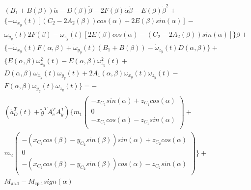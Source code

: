 \begin{equation}%
\label{eq:p3:46}
\begin{multlined}
	( 
		B_{1}+
		B (  \beta  )  
	) \ddot \alpha -
	D (  \beta  ) \ddot \beta -
	2F (  \beta  ) \dot \alpha \dot \beta -
	E (  \beta  )  \dot{\beta}^{2}+ \\
	 \lbrace  
	 	- \omega _{x_{y}} ( t )  
	 		[  
	 			( C_{2}-2A_{2} (  \beta  )  ) cos (  \alpha  ) +
	 			2E (  \beta  ) sin (  \alpha  )    
	 		]  - \\  
	 	\omega _{y_{y}} ( t ) 
	 		2F (  \beta  ) - 
	 	\omega _{z_{y}} ( t )  
	 		[  
	 			 2E (  \beta  ) cos (  \alpha  ) - 
	 			 ( C_{2}-2A_{2} (  \beta  )  ) sin (  \alpha  )    
	 		]  
	 \rbrace   
	 \dot \beta +\\ 
	 \lbrace  
	 	- \dot\omega _{x_{y}} ( t ) F (  \alpha , \beta  )  +   
	 	\dot\omega _{y_{y}} ( t )  ( B_{1}+B (  \beta  )  ) - 
	 	\dot\omega _{z_{y}} ( t ) D (  \alpha , \beta  )  
	 \rbrace  
 	+\\
 	\lbrace  
 		E (  \alpha , \beta  )  \omega _{x_{y}}^{2} ( t ) -
 		E (  \alpha , \beta  )  \omega _{z_{y}}^{2} ( t ) + \\
 		D (  \alpha , \beta  )  \omega _{x_{y}} ( t )  \omega _{y_{y}} ( t ) +
 		2A_{1} (  \alpha , \beta  )  \omega _{x_{y}} ( t )  \omega _{z_{y}} ( t ) -\\
 		F (  \alpha , \beta  )  \omega _{y_{y}} ( t )  \omega _{z_{y}} ( t )  
 	\rbrace  
 =-\\
( 
	\tilde{a}_{O}^{T} ( t ) +\tilde{g}^{T}A_{c}^{T}A_{y}^{T} 
)  
\lbrace  
	m_{1} 
	\left( 
	\begin{array}{c}
		-x_{C_{1}}sin (  \alpha  ) +z_{C_{1}}cos (  \alpha  ) \\
		0\\
		-x_{C_{1}}cos (  \alpha  ) -z_{C_{1}}sin (  \alpha  ) \\
	\end{array}
	\right)  +\\
	m_2
	\left( 
	\begin{array}{c}
	- \left( x_{C_{2}}cos \left(  \beta  \right) -y_{C_{2}}sin \left(  \beta  \right)  \right) sin \left(  \alpha  \right) +z_{C_{2}}cos \left(  \alpha  \right)\\
	0\\
	- \left( x_{C_{2}}cos \left(  \beta  \right) -y_{C_{2}}sin \left(  \beta  \right)  \right) cos \left(  \alpha  \right) -z_{C_{2}}sin \left(  \alpha  \right)\\
	\end{array}
	\right)  
\rbrace 
+\\
M_{\textit{дв.1}}-M_{\textit{тр.1}}sign (  \dot \alpha  )
\end{multlined}
\end{equation}



